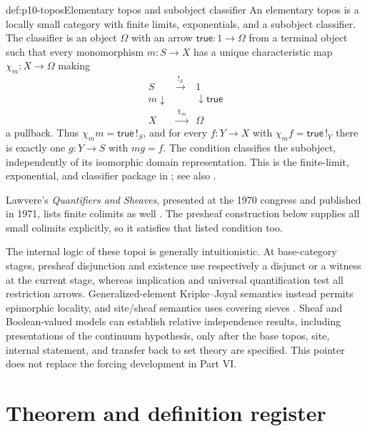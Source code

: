 \begin{hbdefinition}{def:p10-topos}{Elementary topos and subobject classifier}
An elementary topos is a locally small category with finite limits,
exponentials, and a subobject classifier.
The classifier is an object \(\Omega\) with an arrow
\(\mathsf{true}:1\to\Omega\) from a terminal object such that
every monomorphism \(m:S\to X\) has a unique characteristic map
\(\chi_m:X\to\Omega\) making
\[
\begin{array}{ccc}
 S&\xrightarrow{\ !_S\ }&1\\
 {\scriptstyle m}\downarrow&&\downarrow{\scriptstyle\mathsf{true}}\\
 X&\xrightarrow{\ \chi_m\ }&\Omega
\end{array}
\]
a pullback.
Thus \(\chi_m m=\mathsf{true}\,!_S\), and for every
\(f:Y\to X\) with \(\chi_m f=\mathsf{true}\,!_Y\) there is
exactly one \(g:Y\to S\) with \(m g=f\).
The condition classifies the subobject, independently of its
isomorphic domain representation.
This is the finite-limit, exponential, and classifier package in
\cite[Definition~1.2, p.~8]{MoerdijkVanOosten2007Topos};
see also \cite{MacLaneMoerdijk1992,Johnstone2002}.
\end{hbdefinition}

Lawvere's \emph{Quantifiers and Sheaves}, presented at the 1970
congress and published in 1971, lists finite colimits as well
\cite[p.~329]{Lawvere1970}.
The presheaf construction below supplies all small colimits
explicitly, so it satisfies that listed condition too.




The internal logic of these topoi is generally intuitionistic.
At base-category stages, presheaf disjunction and existence use
respectively a disjunct or a witness at the current stage, whereas
implication and universal quantification test all restriction arrows.
Generalized-element Kripke--Joyal semantics instead permits
epimorphic locality, and site/sheaf semantics uses covering sieves
\cite[\S1.2, p.~13; \S2.2, p.~32; \S3.3, pp.~58--59]
{MoerdijkVanOosten2007Topos}.
Sheaf and Boolean-valued
models can establish relative independence results, including presentations
of the continuum hypothesis, only after the base topos, site, internal
statement, and transfer back to set theory are specified. This pointer does not
replace the forcing development in Part VI.

\section{Theorem and definition register}
\label{sec:p10-theorem-register}

